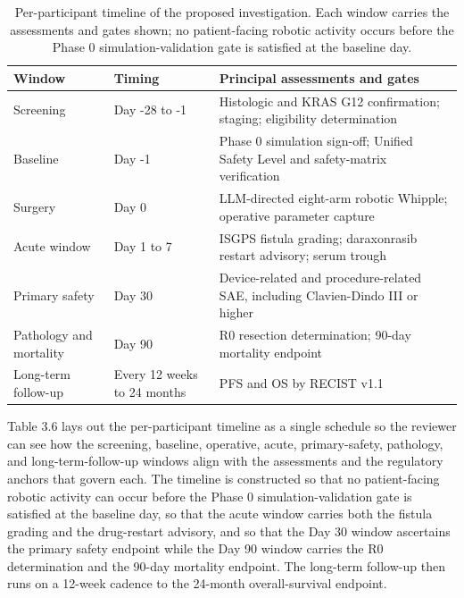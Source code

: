 \clearpage

\begin{table}[t]
\caption{Per-participant timeline of the proposed investigation. Each window carries
the assessments and gates shown; no patient-facing robotic activity occurs before
the Phase 0 simulation-validation gate is satisfied at the baseline day.}
\label{tab:sec02-timeline}
\centering
\begin{tabularx}{\textwidth}{L{3.0cm} L{2.4cm} Y}
\toprule
\textbf{Window} & \textbf{Timing} & \textbf{Principal assessments and gates} \\
\midrule
Screening & Day -28 to -1 & Histologic and KRAS G12 confirmation; staging; eligibility determination \\
Baseline & Day -1 & Phase 0 simulation sign-off; Unified Safety Level and safety-matrix verification \\
Surgery & Day 0 & LLM-directed eight-arm robotic Whipple; operative parameter capture \\
Acute window & Day 1 to 7 & ISGPS fistula grading; daraxonrasib restart advisory; serum trough \\
Primary safety & Day 30 & Device-related and procedure-related SAE, including Clavien-Dindo III or higher \\
Pathology and mortality & Day 90 & R0 resection determination; 90-day mortality endpoint \\
Long-term follow-up & Every 12 weeks to 24 months & PFS and OS by RECIST v1.1 \\
\bottomrule
\end{tabularx}
\end{table}
\vspace*{-1.45cm}

Table 3.6 lays out the per-participant timeline as a single schedule so the
reviewer can see how the screening, baseline, operative, acute, primary-safety,
pathology, and long-term-follow-up windows align with the assessments and the
regulatory anchors that govern each. The timeline is constructed so that no
patient-facing robotic activity can occur before the Phase 0 simulation-validation
gate is satisfied at the baseline day, so that the acute window carries both the
fistula grading and the drug-restart advisory, and so that the Day 30 window
ascertains the primary safety endpoint while the Day 90 window carries the R0
determination and the 90-day mortality endpoint. The long-term follow-up then runs
on a 12-week cadence to the 24-month overall-survival endpoint.



